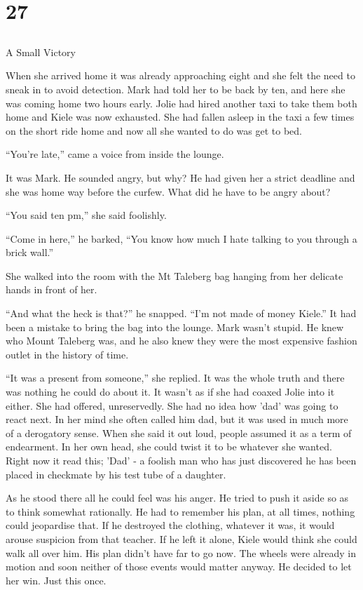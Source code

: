 \chapter{27}
\section{}
A Small Victory  

When she arrived home it was already approaching eight and she felt the need to sneak in to avoid detection.  Mark had told her to be back by ten, and here she was coming home two hours early.  Jolie had hired another taxi to take them both home and Kiele was now exhausted.  She had fallen asleep in the taxi a few times on the short ride home and now all she wanted to do was get to bed.

``You're late,'' came a voice from inside the lounge.  

It was Mark.  He sounded angry, but why?  He had given her a strict deadline and she was home way before the curfew.  What did he have to be angry about?

``You said ten pm,'' she said foolishly.

``Come in here,'' he barked, ``You know how much I hate talking to you through a brick wall.''

She walked into the room with the Mt Taleberg bag hanging from her delicate hands in front of her.  

``And what the heck is that?'' he snapped.  ``I'm not made of money Kiele.''  It had been a mistake to bring the bag into the lounge.  Mark wasn't stupid.  He knew who Mount Taleberg was, and he also knew they were the most expensive fashion outlet in the history of time.  

``It was a present from someone,'' she replied.  It was the whole truth and there was nothing he could do about it.  It wasn't as if she had coaxed Jolie into it either.  She had offered, unreservedly.  She had no idea how 'dad' was going to react next.  In her mind she often called him dad, but it was used in much more of a derogatory sense.  When she said it out loud, people assumed it as a term of endearment.  In her own head, she could twist it to be whatever she wanted.  Right now it read this; 'Dad' - a foolish man who has just discovered he has been placed in checkmate by his test tube of a daughter.

As he stood there all he could feel was his anger.  He tried to push it aside so as to think somewhat rationally.  He had to remember his plan, at all times, nothing could jeopardise that.  If he destroyed the clothing, whatever it was, it would arouse suspicion from that teacher.  If he left it alone, Kiele would think she could walk all over him.  His plan didn't have far to go now.  The wheels were already in motion and soon neither of those events would matter anyway.  He decided to let her win.  Just this once.


